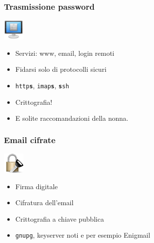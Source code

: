 \documentclass[xcolor=svgnames]{beamer}
\begin{document}
\begin{frame}
	\frametitle{Trasmissione password}

	\begin{block}{\includegraphics[width=40px]{img/login.png}}
			\begin{itemize}
					\item Servizi: www, email, login remoti
						\pause
					\item Fidarsi solo di protocolli sicuri
						\pause
					\item \texttt{http{\bf s}}, \texttt{imap{\bf s}}, \texttt{{\bf s}sh}
						\pause
					\item Crittografia!
						\pause
					\item E solite raccomandazioni della nonna.
			\end{itemize}
	\end{block}
\end{frame}

\begin{frame}
	\frametitle{Email cifrate}

	\begin{block}{\includegraphics[width=40px]{img/crypto.png}}
			\begin{itemize}
					\item Firma digitale
						\pause
					\item Cifratura dell'email
						\pause
					\item Crittografia a chiave pubblica
						\pause
					\item \texttt{gnupg}, keyserver noti e per esempio Enigmail
			\end{itemize}
	\end{block}
						
	\pause

\end{frame}
\end{document}
